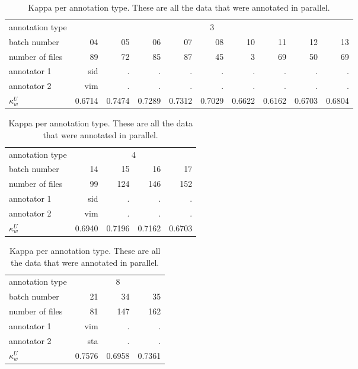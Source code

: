 \begin{table}[htdp]
\begin{small}
\begin{tabular}{l|r|r|r|r|r|r|r|r|r}
annotation type   & \multicolumn{9}{c}{3}   \\
batch number   & 04   & 05   & 06   & 07   & 08   & 10   & 11   & 12   & 13   \\
number of files & 89   & 72   & 85   & 87   & 45   & 3    & 69   & 50   & 69   \\
annotator 1  & sid  & .    & .    & .    & .    & .    & .    & .    & .    \\
annotator 2  & vim  & .    & .    & .    & .    & .    & .    & .    & .    \\
$\kappa_w^U$  & 0.6714 & 0.7474 & 0.7289 & 0.7312 & 0.7029 & 0.6622 & 0.6162 & 0.6703 & 0.6804 \\
\hline
\end{tabular}

\begin{tabular}{l|r|r|r|r}
annotation type & \multicolumn{4}{c}{4}  \\
batch number    & 14   & 15   & 16   & 17   \\
number of files & 99   & 124  & 146  & 152  \\
annotator 1     & sid  & .    & .    & .    \\
annotator 2     & vim  & .    & .    & .    \\
$\kappa_w^U$    & 0.6940 & 0.7196 & 0.7162 & 0.6703 \\
\hline
\end{tabular}

\begin{tabular}{l|r|r|r}
annotation type & \multicolumn{3}{c}{8} \\
batch number    & 21   & 34   & 35   \\
number of files & 81   & 147  & 162  \\
annotator 1     & vim  & .    & .    \\
annotator 2     & sta  & .    & .    \\
$\kappa_w^U$    & 0.7576 & 0.6958 & 0.7361 \\
\end{tabular}
\caption{Kappa per annotation type. These are all the data that were annotated in parallel.}
\label{tab:kappa}
\end{small}
\end{table}%

